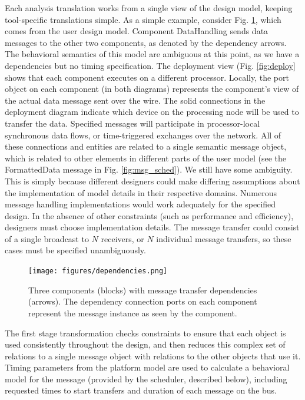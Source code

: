 Each analysis translation works from a single view of the design model, keeping 
tool-specific translations simple.  As a simple example, consider Fig. \ref{fig:deps}, 
which comes from the user design model.   Component DataHandling sends data messages to 
the other two components, as denoted by the dependency arrows.  The behavioral semantics 
of this model are ambiguous at this point, as we have a dependencies but no timing 
specification.  The deployment view (Fig. \ref{fig:deploy} shows that each component 
executes on a different processor.  Locally, the port object on each component (in 
both diagrams) represents the component's view of the actual data message sent over the 
wire. The solid connections in the deployment diagram indicate which device on the processing 
node will be used to transfer the data.  Specified messages will participate in processor-local 
synchronous data flows, or time-triggered exchanges over the network.  All of these connections 
and entities are related to a single semantic message object, which is related to other elements 
in different parts of the user model (see the FormattedData message in Fig. \ref{fig:msg_sched}).  
We still have some ambiguity.  This is simply because different designers could make differing 
assumptions about the implementation of model details in their respective domains.  Numerous 
message handling implementations would work adequately for the specified design.  In the absence 
of other constraints (such as performance and efficiency), designers must choose implementation 
details.  The message transfer could consist of a single broadcast to $N$ receivers, or $N$ individual 
message transfers, so these cases must be specified unambiguously.

\begin{figure}
\centering
\texttt{[image: figures/dependencies.png]}
    \caption{Three components (blocks) with message transfer dependencies (arrows). The dependency 
connection ports on each component represent the message instance as seen by the component.}
    \label{fig:deps}
\end{figure}


The first stage transformation checks constraints to ensure that each object is used 
consistently throughout the design, and then reduces this complex set of relations to 
a single message object with relations to the other objects that use it.  Timing parameters 
from the platform model are used to calculate a behavioral model for the message (provided 
by the scheduler, described below), including requested times to start transfers and duration 
of each message on the bus.

